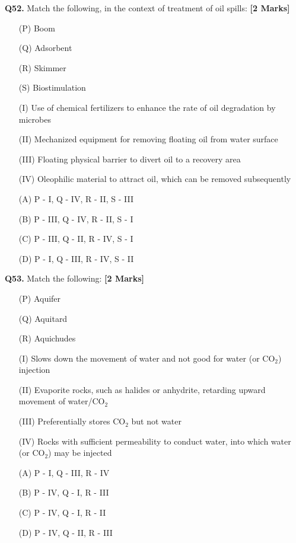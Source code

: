 \documentclass[11pt]{article}
\newcommand{\questionb}[2]{
    \noindent\textbf{Q#2.} #1 \hfill \textbf{[2 Marks]}
}
\begin{document}
\questionb{Match the following, in the context of treatment of oil spills:}{52}
\begin{enumerate}
    \item[(P)] Boom
    \item[(Q)] Adsorbent
    \item[(R)] Skimmer
    \item[(S)] Biostimulation
    \item[(I)] Use of chemical fertilizers to enhance the rate of oil degradation by microbes
    \item[(II)] Mechanized equipment for removing floating oil from water surface
    \item[(III)] Floating physical barrier to divert oil to a recovery area
    \item[(IV)] Oleophilic material to attract oil, which can be removed subsequently
    \item[(A)] P - I, Q - IV, R - II, S - III
    \item[(B)] P - III, Q - IV, R - II, S - I
    \item[(C)] P - III, Q - II, R - IV, S - I
    \item[(D)] P - I, Q - III, R - IV, S - II
\end{enumerate}
\vspace{0.5cm}

\questionb{Match the following:}{53}
\begin{enumerate}
    \item[(P)] Aquifer
    \item[(Q)] Aquitard
    \item[(R)] Aquichudes
    
    \item[(I)] Slows down the movement of water and not good for water (or CO\(_2\)) injection
    \item[(II)] Evaporite rocks, such as halides or anhydrite, retarding upward movement of water/CO\(_2\)
    \item[(III)] Preferentially stores CO\(_2\) but not water
    \item[(IV)] Rocks with sufficient permeability to conduct water, into which water (or CO\(_2\)) may be injected
    \item[(A)] P - I, Q - III, R - IV
    \item[(B)] P - IV, Q - I, R - III
    \item[(C)] P - IV, Q - I, R - II
    \item[(D)] P - IV, Q - II, R - III
\end{enumerate}
\vspace{0.5cm}
\end{document}
